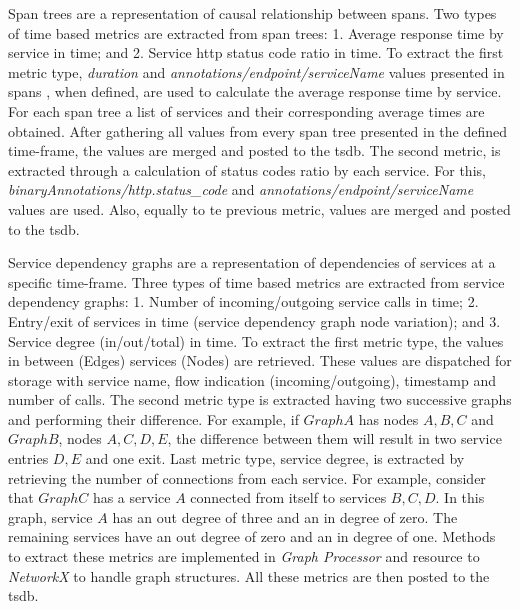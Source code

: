 Span trees are a representation of causal relationship between spans. Two types of time based metrics are extracted from span trees: 1. Average response time by service in time; and 2. Service \gls{http} status code ratio in time. To extract the first metric type, \emph{duration} and \emph{annotations/endpoint/serviceName} values presented in spans , when defined, are used to calculate the average response time by service. For each span tree a list of services and their corresponding average times are obtained. After gathering all values from every span tree presented in the defined time-frame, the values are merged and posted to the \gls{tsdb}. The second metric, is extracted through a calculation of status codes ratio by each service. For this, \emph{binaryAnnotations/http.status\_code} and \emph{annotations/endpoint/serviceName} values are used. Also, equally to te previous metric, values are merged and posted to the \gls{tsdb}.

Service dependency graphs are a representation of dependencies of services at a specific time-frame. Three types of time based metrics are extracted from service dependency graphs: 1. Number of incoming/outgoing service calls in time; 2. Entry/exit of services in time (service dependency graph node variation); and 3. Service degree (in/out/total) in time. To extract the first metric type, the values in between (Edges) services (Nodes) are retrieved. These values are dispatched for storage with service name, flow indication (incoming/outgoing), timestamp and number of calls. The second metric type is extracted having two successive graphs and performing their difference. For example, if $Graph A$ has nodes ${A, B, C}$ and $Graph B$, nodes ${A, C, D, E}$, the difference between them will result in two service entries ${D, E}$ and one exit. Last metric type, service degree, is extracted by retrieving the number of connections from each service. For example, consider that $Graph C$ has a service $A$ connected from itself to services ${B, C, D}$. In this graph, service $A$ has an out degree of three and an in degree of zero. The remaining services have an out degree of zero and an in degree of one. Methods to extract these metrics are implemented in \emph{Graph Processor} and resource to \emph{NetworkX} to handle graph structures. All these metrics are then posted to the \gls{tsdb}.

